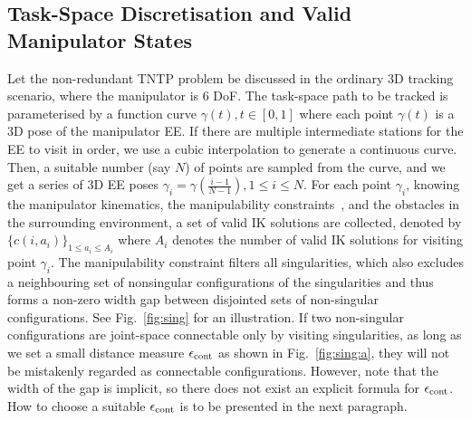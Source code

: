 \documentclass[letterpaper, 10 pt, conference]{ieeeconf}  %
\begin{document}
\subsection{Task-Space Discretisation and Valid Manipulator States}
Let the non-redundant TNTP problem be discussed in the ordinary 3D tracking scenario, where the manipulator is 6 DoF. 
The task-space path to be tracked is parameterised by a function curve $\gamma(t), t\in [0, 1]$ where each point $\gamma(t)$ is a 3D pose of the manipulator EE. 
If there are multiple intermediate stations for the EE to visit in order, we use a cubic interpolation to generate a continuous curve. 
Then, a suitable number (say $N$) of points are sampled from the curve, and we get a series of 3D EE poses $\gamma_i = \gamma(\frac{i-1}{N-1}), 1\leq i\leq N$. 
For each point $\gamma_i$, knowing the manipulator kinematics, the manipulability constraints~\cite{yoshikawa1990translational}, and the obstacles in the surrounding environment, a set of valid IK solutions are collected, denoted by $\{c(i, a_i)\}_{1\leq a_i\leq A_i}$ where $A_i$ denotes the number of valid IK solutions for visiting point $\gamma_i$. 
The manipulability constraint filters all singularities, which also excludes a neighbouring set of nonsingular configurations of the singularities and thus forms a non-zero width gap between disjointed sets of non-singular configurations. 
See Fig.~\ref{fig:sing} for an illustration.
If two non-singular configurations are joint-space connectable only by visiting singularities, as long as we set a small distance measure $\epsilon_{\rm cont}$ as shown in Fig.~\ref{fig:sing:a}, they will not be mistakenly regarded as connectable configurations. 
However, note that the width of the gap is implicit, so there does not exist an explicit formula for $\epsilon_{\rm cont}$. How to choose a suitable $\epsilon_{\rm cont}$ is to be presented in the next paragraph. 
\end{document}
